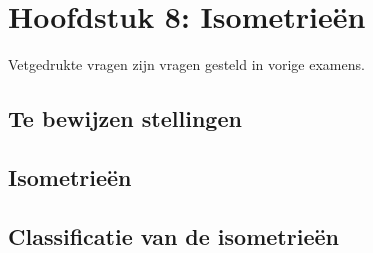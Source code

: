 \documentclass[12pt]{article}
\begin{document}
\date{}    
\maketitle
    \section*{Hoofdstuk 8: Isometrieën}
    Vetgedrukte vragen zijn vragen gesteld in vorige examens.
    \setcounter{section}{8}
    \subsection*{Te bewijzen stellingen}
    \subsection{Isometrieën}
    \subsection{Classificatie van de isometrieën}
\end{document}
